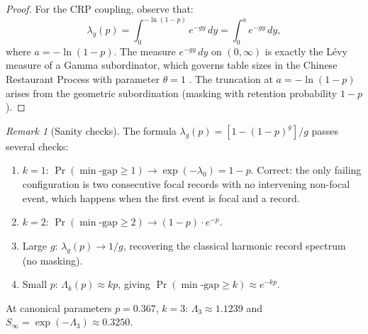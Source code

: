 \documentclass[11pt]{article}
\theoremstyle{plain}
\theoremstyle{definition}
\theoremstyle{remark}
\newtheorem{remark}[theorem]{Remark}
\begin{document}
\begin{proof}
For the CRP coupling, observe that:
\[
  \lambda_g(p) = \int_0^{-\ln(1-p)} e^{-gy}\, dy
  = \int_0^a e^{-gy}\, dy,
\]
where $a = -\ln(1-p)$.  The measure $e^{-gy}\, dy$ on $(0,\infty)$ is
exactly the L\'evy measure of a Gamma subordinator, which governs table
sizes in the Chinese Restaurant Process with parameter $\theta = 1$
\cite{pitman2006combinatorial}.  The truncation at $a = -\ln(1-p)$
arises from the geometric subordination (masking with retention
probability $1-p$).
\end{proof}

\begin{remark}[Sanity checks]\label{rem:sanity}
The formula $\lambda_g(p) = [1-(1-p)^g]/g$ passes several checks:
\begin{enumerate}[label=(\roman*),nosep]
  \item $k = 1$: $\Pr(\min\text{-gap} \ge 1) \to
    \exp(-\lambda_0) = 1-p$.  Correct: the only failing configuration
    is two consecutive focal records with no intervening non-focal
    event, which happens when the first event is focal and a record.
  \item $k = 2$: $\Pr(\min\text{-gap} \ge 2) \to (1-p) \cdot e^{-p}$.
  \item Large $g$: $\lambda_g(p) \to 1/g$, recovering the classical
    harmonic record spectrum (no masking).
  \item Small $p$: $\Lambda_k(p) \approx kp$, giving
    $\Pr(\min\text{-gap} \ge k) \approx e^{-kp}$.
\end{enumerate}
At canonical parameters $p = 0.367$, $k = 3$:
$\Lambda_3 \approx 1.1239$ and
$S_\infty = \exp(-\Lambda_3) \approx 0.3250$.
\end{remark}
\end{document}
